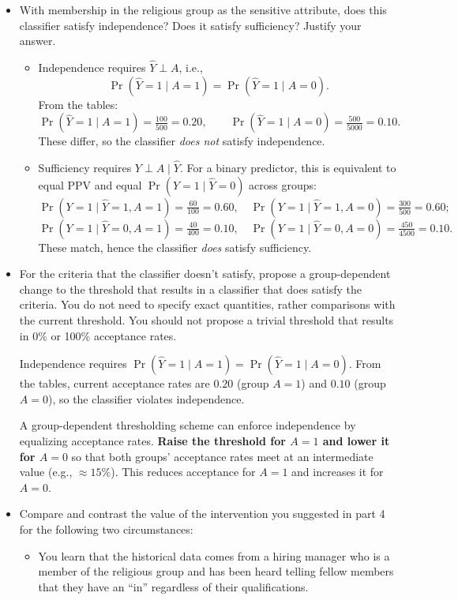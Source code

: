 \documentclass[a4paper]{article}
\begin{document}
\begin{itemize}
    \item With membership in the religious group as the sensitive attribute, does this classifier satisfy independence? Does it satisfy sufficiency? Justify your answer.
        \begin{itemize}
            \item Independence requires $\hat Y \perp A$, i.e.,
\[
\Pr(\hat Y=1\mid A=1)=\Pr(\hat Y=1\mid A=0).
\]
From the tables:
\[
\Pr(\hat Y=1\mid A=1)=\tfrac{100}{500}=0.20,\qquad
\Pr(\hat Y=1\mid A=0)=\tfrac{500}{5000}=0.10.
\]
These differ, so the classifier \emph{does not} satisfy independence.
            \item Sufficiency requires $Y \perp A \mid \hat Y$. For a binary predictor, this is equivalent to equal PPV and equal $\Pr(Y=1\mid \hat Y=0)$ across groups:
\[
\Pr(Y=1\mid \hat Y=1,A=1)=\tfrac{60}{100}=0.60,\quad
\Pr(Y=1\mid \hat Y=1,A=0)=\tfrac{300}{500}=0.60;
\]
\[
\Pr(Y=1\mid \hat Y=0,A=1)=\tfrac{40}{400}=0.10,\quad
\Pr(Y=1\mid \hat Y=0,A=0)=\tfrac{450}{4500}=0.10.
\]
These match, hence the classifier \emph{does} satisfy sufficiency.
        \end{itemize}
    \item For the criteria that the classifier doesn’t satisfy, propose a group-dependent change to the threshold that results in a classifier that does satisfy the criteria. You do not need to specify exact quantities, rather comparisons with the current threshold. You should not propose a trivial threshold that results in 0\% or 100\% acceptance rates.

        Independence requires $\Pr(\hat Y=1\mid A=1)=\Pr(\hat Y=1\mid A=0)$. 
        From the tables, current acceptance rates are $0.20$ (group $A=1$) and $0.10$ (group $A=0$), so the classifier violates independence.

        A group-dependent thresholding scheme can enforce independence by equalizing acceptance rates.
        \textbf{Raise the threshold for $A=1$ and lower it for $A=0$} so that both groups’ acceptance rates meet at an intermediate value (e.g., $\approx 15\%$). This reduces acceptance for $A=1$ and increases it for $A=0$.

    \item Compare and contrast the value of the intervention you suggested in part 4 for the following two circumstances:
        \begin{itemize}
            \item You learn that the historical data comes from a hiring manager who is a member of the religious group and has been heard telling fellow members that they have an “in” regardless of their qualifications.


\end{itemize}
\end{itemize}
\end{document}
